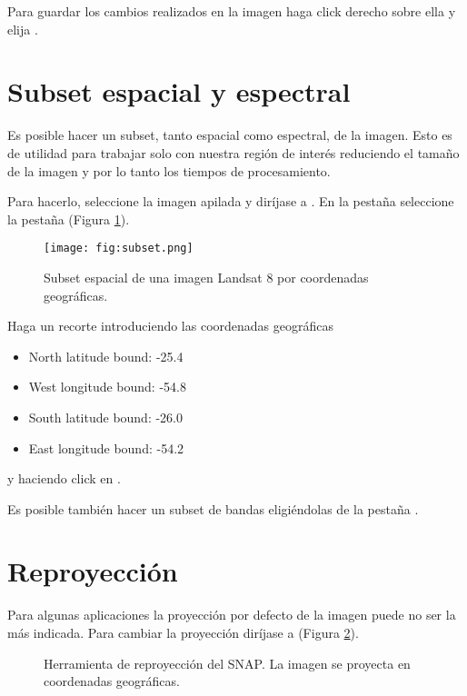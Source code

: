 Para guardar los cambios realizados en la imagen haga click derecho sobre ella y elija .

\section{Subset espacial y espectral}
Es posible hacer un subset, tanto espacial como espectral, de la imagen. Esto es de utilidad para trabajar solo con nuestra región de interés reduciendo el tamaño de la imagen y por lo tanto los tiempos de procesamiento.

Para hacerlo, seleccione la imagen apilada y diríjase a . En la pestaña  seleccione la pestaña  (Figura \ref{fig:subset}).

\begin{figure}[h!]
    \centering
    \texttt{[image: fig:subset.png]}
    \caption{Subset espacial de una imagen Landsat 8 por coordenadas geográficas.}
    \label{fig:subset}
\end{figure}

Haga un recorte introduciendo las coordenadas geográficas

\begin{itemize}
    \item North latitude bound: -25.4
    \item West longitude bound: -54.8
    \item South latitude bound: -26.0
    \item East longitude bound: -54.2
\end{itemize}

y haciendo click en .

Es posible también hacer un subset de bandas eligiéndolas de la pestaña .

\section{Reproyección}
Para algunas aplicaciones la proyección por defecto de la imagen puede no ser la más indicada. Para cambiar la proyección diríjase a  (Figura \ref{fig:repro}).

\begin{figure}[h!]
    \centering
    \hspace{1cm}
    \caption{Herramienta de reproyección del SNAP. La imagen se proyecta en coordenadas geográficas.}
    \label{fig:repro}
\end{figure}

